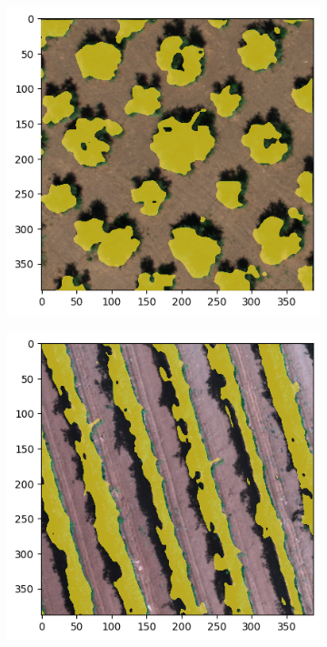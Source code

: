 \documentclass[comsoc,final]{IEEEtran}
\begin{document}
\begin{figure}{\centering%
      \begin{subfigure}[b]{0.47\columnwidth}
         \centering \includegraphics[width=\columnwidth]{ULIVO0INF}
     \end{subfigure}%
%
      \begin{subfigure}[b]{0.47\columnwidth}
         \centering \includegraphics[width=\columnwidth]{VITE0INF}

\end{subfigure}}
\end{figure}
\end{document}
